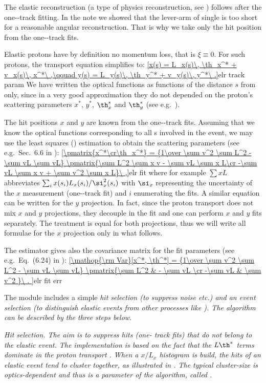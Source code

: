 The elastic reconstruction (a type of physics reconstruction, see ) follows after the one--track fitting. In the note  we showed that the lever-arm of single  is too short for a reasonable angular reconstruction. That is why we take only the hit position from the one--track fits.

Elastic protons have by definition no momentum loss, that is $\xi \equiv 0$. For such protons, the transport equation  simplifies to:
\eqref{x(s) = L_x(s)\, \th_x^* + v_x(s)\, x^*\ ,\qquad y(s) = L_y(s)\, \th_y^* + v_y(s)\, y^*\ .}{elr track param}
We have written the optical functions as functions of the distance $s$ from  only, since in a very good approximation they do not depended on the proton's scattering parameters $x^*$, $y^*$, $\th^*_x$ and $\th^*_y$ (see e.g.~).

The hit positions $x$ and $y$ are known from the one--track fits. Assuming that we know the optical functions corresponding to all s involved in the event, we may use the least squares () estimation to obtain the scattering parameters (see e.g.~Sec.~6.6 in ):
\eqref{\pmatrix{x^*\cr\th_x^*} = {1\over \sum v^2 \sum L^2 - \sum vL \sum vL} \pmatrix{\sum L^2 \sum x v - \sum vL \sum x L\cr -\sum vL \sum x v + \sum v^2 \sum x L}\ ,}{elr fit}
where for example $\sum x L$ abbreviates $\sum_{i} x(s_i) L_x(s_i) / \si_x^2(s_i)$ with $\si_x$ representing the uncertainty of the $x$ measurement (one--track fit) and $i$ enumerating the  fits. A similar equation can be written for the $y$ projection. In fact, since the proton transport  does not mix $x$ and $y$ projections, they decouple in the fit and one can perform $x$ and $y$ fits separately. The treatment is equal for both projections, thus we will write all formulae for the $x$ projection only in what follows.

The  estimator gives also the covariance matrix for the fit parameters (see e.g.~Eq.~(6.24) in ):
\eqref{\mathop{\rm Var}[x^*, \th^*] = {1\over \sum v^2 \sum L^2 - \sum vL \sum vL} \pmatrix{\sum L^2 & - \sum vL \cr -\sum vL & \sum v^2 }\ .
}{elr fit err}

The module includes a simple \em{hit selection} (to suppress noise etc.) and an \em{event selection} (to distinguish elastic events from other processes like ). The algorithm can be described by the three steps below.

\bitm
\itm \em{Hit selection}. The aim is to suppress hits (one- track fits) that do not belong to the elastic event. The implementation is based on the fact that the $L\th^*$ terms dominate in the proton transport 
. When a $x/L_x$ histogram is build, the hits of an elastic event tend to cluster together, as illustrated in . The typical cluster-size is optics-dependent and thus is a parameter of the algorithm, called .

